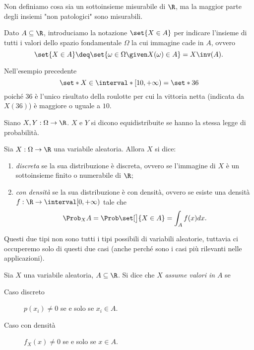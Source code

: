 \begin{remark}
    Non definiamo cosa sia un sottoinsieme misurabile di $\R$, ma la maggior parte degli insiemi "non patologici" sono misurabili.
\end{remark}

Dato $A \subseteq \R$, introduciamo la notazione $\set{X \in A}$ per indicare l'insieme di tutti i valori dello spazio fondamentale $\Omega$ la cui immagine cade in $A$, ovvero \[
    \set{X \in A} \deq \set{\omega \in \Omega \given X(\omega) \in A} = X\inv(A).    
\] 

\begin{example}
    Nell'esempio precedente \[
        \set*{X \in \interval*[{10, +\infty})} = \set*{36}    
    \] poiché $36$ è l'unico risultato della roulotte per cui la vittoria netta (indicata da $X(36)$) è maggiore o uguale a $10$.
\end{example}

\begin{definition}
     Siano $X, Y : \Omega \to \R$. $X$ e $Y$ si dicono equidistribuite se hanno la stessa legge di probabilità.
\end{definition}

\begin{definition}
     Sia $X : \Omega \to \R$ una variabile aleatoria. Allora $X$ si dice: \begin{enumerate}
        \item \emph{discreta} se la sua distribuzione è discreta, ovvero se l'immagine di $X$ è un sottoinsieme finito o numerabile di $\R$;
        \item \emph{con densità} se la sua distribuzione è con densità, ovvero se esiste una densità $f : \R \to \interval[{0, +\infty})$ tale che \[
            \Prob_{X}{A} = \Prob\set[\big]{X \in A} = \int_A f(x)dx.    
        \]
    \end{enumerate}
\end{definition}

Questi due tipi non sono tutti i tipi possibili di variabili aleatorie, tuttavia ci occuperemo solo di questi due casi (anche perché sono i casi più rilevanti nelle applicazioni).

\begin{definition}
    Sia $X$ una variabile aleatoria, $A \subseteq \R$. Si dice che $X$ \emph{assume valori in} $A$ se
    \begin{description}
        \item[Caso discreto] $p(x_i) \neq 0$ se e solo se $x_i \in A$.
        \item[Caso con densità] $f_X(x) \neq 0$ se e solo se $x \in A$. 
    \end{description}
\end{definition}

